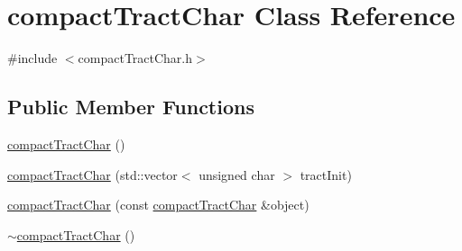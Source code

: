\hypertarget{classcompactTractChar}{\section{compact\-Tract\-Char \-Class \-Reference}
\label{classcompactTractChar}
}


{\ttfamily \#include $<$compact\-Tract\-Char.\-h$>$}

\subsection*{\-Public \-Member \-Functions}
\begin{DoxyCompactItemize}
\item 
\hyperlink{classcompactTractChar_a6c70cebeac0797ccda21fac0ff532d10}{compact\-Tract\-Char} ()
\item 
\hyperlink{classcompactTractChar_ab1d7cd1687ea942ff791ec3a8583d87d}{compact\-Tract\-Char} (std\-::vector$<$ unsigned char $>$ tract\-Init)
\item 
\hyperlink{classcompactTractChar_a4ad4dd87b23e608f36ce9265d8e0ea67}{compact\-Tract\-Char} (const \hyperlink{classcompactTractChar}{compact\-Tract\-Char} \&object)
\item 
\hypertarget{classcompactTractChar_ab2513dd175d8fdbd5cd919bc66c6a0e8}{\hyperlink{classcompactTractChar_ab2513dd175d8fdbd5cd919bc66c6a0e8}{$\sim$compact\-Tract\-Char} ()}\label{classcompactTractChar_ab2513dd175d8fdbd5cd919bc66c6a0e8}


\end{DoxyCompactItemize}
